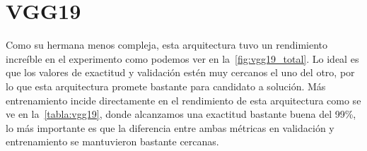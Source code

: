 \section{VGG19}

Como su hermana menos compleja, esta arquitectura tuvo un rendimiento increíble
en el experimento como podemos ver en la~\autoref{fig:vgg19_total}. Lo ideal es
que los valores de exactitud y validación estén muy cercanos el uno del otro,
por lo que esta arquitectura promete bastante para candidato a solución. Más
entrenamiento incide directamente en el rendimiento de esta arquitectura como se
ve en la~\autoref{tabla:vgg19}, donde alcanzamos una exactitud bastante buena
del 99\%, lo más importante es que la diferencia entre ambas métricas en
validación y entrenamiento se mantuvieron bastante cercanas.

